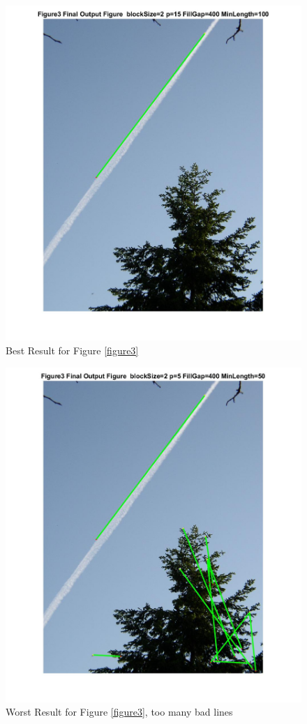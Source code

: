 \begin{figure}[hbtp]
	\centering
	\includegraphics[width=6in]{pic/Figure3_best.jpg}
	\caption{Best Result for Figure \ref{figure3}}
	\label{Figure3_best}
\end{figure}


\begin{figure}[hbtp]
	\centering
	\includegraphics[width=6in]{pic/Figure3_worst.jpg}
	\caption{Worst Result for Figure \ref{figure3}, too many bad lines}
	\label{Figure3_worst}
\end{figure}

